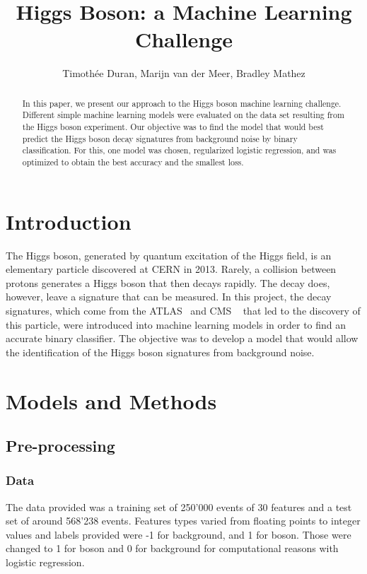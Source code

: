 \documentclass[10pt,conference,compsocconf]{IEEEtran}
\begin{document}
\title{Higgs Boson: a Machine Learning Challenge}

\author{
  Timothée Duran, Marijn van der Meer, Bradley Mathez
}

\maketitle

\begin{abstract}

 In this paper, we present our approach to the Higgs boson machine learning challenge. Different simple machine learning models were evaluated on the data set resulting from the Higgs boson experiment. Our objective was to find the model that would best predict the Higgs boson decay signatures from background noise by binary classification. For this, one model was chosen, regularized logistic regression, and was optimized to obtain the best accuracy and the smallest loss.  
\end{abstract}

\section{Introduction}\label{sec: introduction}
The Higgs boson, generated by quantum excitation of the Higgs field, is an elementary particle discovered at CERN in 2013. Rarely, a collision between protons generates a Higgs boson that then decays rapidly. The decay does, however, leave a signature that can be measured. In this project, the decay signatures, which come from the ATLAS~\cite{Aad_2012} and CMS  ~\cite{Chatrchyan_2012} that led to the discovery of this particle, were introduced into machine learning models in order to find an accurate binary classifier. The objective was to develop a model that would allow the identification of the Higgs boson signatures from background noise.
\section{Models and Methods}\label{sec: models_methods}
  \subsection{Pre-processing}\label{subsec:pre-proc}
  \subsubsection{Data}\label{subsubsec:data}
  The data provided was a training set of 250'000 events of 30 features and a test set of around 568'238 events. Features types varied from floating points to integer values and labels provided were -1 for background, and 1 for boson. Those were changed to 1 for boson and 0 for background for computational reasons with logistic regression. 
\end{document}
